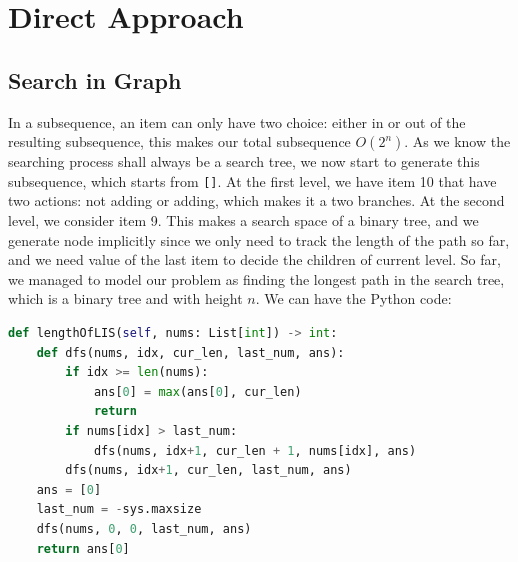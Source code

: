 \documentclass[../main.tex]{subfiles}
\begin{document}
\section{Direct Approach}
\subsection{Search in Graph}
In a subsequence, an item can only have two choice: either in or out of the resulting subsequence, this makes our total subsequence $O(2^n)$. As we know the searching process shall always be a search tree, we now start to generate this subsequence, which starts from \texttt{[]}. At the first level, we have item 10 that have two actions: not adding or adding, which makes it a two branches. At the second level, we consider item 9. This makes a search space of a binary tree, and we generate node implicitly since we only need to track the length of the path so far, and we need value of the last item to decide the children of current level. So far, we managed to model our problem as finding the longest path in the search tree, which is a binary tree and with height $n$. We can have the Python code:
\begin{lstlisting}[language=Python]
def lengthOfLIS(self, nums: List[int]) -> int:
    def dfs(nums, idx, cur_len, last_num, ans):
        if idx >= len(nums):
            ans[0] = max(ans[0], cur_len)
            return 
        if nums[idx] > last_num:
            dfs(nums, idx+1, cur_len + 1, nums[idx], ans)
        dfs(nums, idx+1, cur_len, last_num, ans)
    ans = [0]
    last_num = -sys.maxsize
    dfs(nums, 0, 0, last_num, ans)
    return ans[0]
\end{lstlisting}
\end{document}
